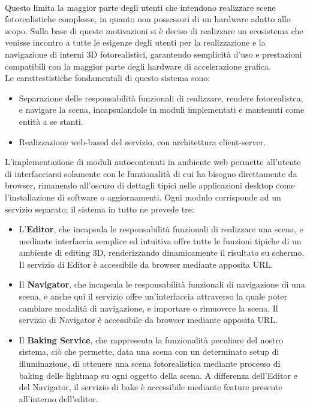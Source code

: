 \\Questo limita la maggior parte degli utenti che intendono realizzare scene fotorealistiche complesse, in quanto non possessori di un hardware adatto allo scopo. Sulla base di queste motivazioni si è deciso di realizzare un ecosistema che venisse incontro a tutte le esigenze degli utenti per la realizzazione e la navigazione di interni 3D fotorealistici, garantendo semplicità d’uso e prestazioni compatibili con la maggior parte degli hardware di accelerazione grafica. 
\\
Le carattestistiche fondamentali di questo sistema sono:
\begin{itemize}
\item Separazione delle responsabilità funzionali di realizzare, rendere fotorealistca, e navigare la scena, incapsulandole in moduli implementati e mantenuti come entità a se stanti.
\item Realizzazione  web-based del servizio, con architettura client-server. 
\end{itemize}
L’implementazione di moduli autocontenuti in ambiente web permette all’utente di interfacciarsi solamente con le funzionalità di cui ha bisogno direttamente da browser, rimanendo all’oscuro di dettagli tipici nelle applicazioni desktop come l’installazione di software o aggiornamenti. Ogni modulo corrisponde ad un servizio separato; il sistema in tutto ne prevede tre:
\begin{itemize}
\item L'\textbf{Editor}, che incapsula le responsabilità funzionali di realizzare una scena, e mediante interfaccia semplice ed intuitiva offre tutte le funzioni tipiche di un ambiente di editing 3D, renderizzando dinamicamente il risultato su schermo. Il servizio di Editor è accessibile da browser mediante apposita URL.
\item Il \textbf{Navigator}, che incapsula le responsabilità funzionali di navigazione di una scena, e anche qui il servizio offre un’interfaccia attraverso la quale poter cambiare modalità di navigazione, e importare o rimuovere la scena. Il servizio di Navigator è accessibile da browser mediante apposita URL.
\item Il \textbf{Baking Service}, che rappresenta la funzionalità peculiare del nostro sistema, ciò che permette, data una scena con un determinato setup di illuminazione, di ottenere una scena fotorealistica mediante processo di baking delle lightmap su ogni oggetto della scena. A differenza dell’Editor e del Navigator, il servizio di bake è accessibile mediante feature presente all’interno dell’editor.
\end{itemize}
